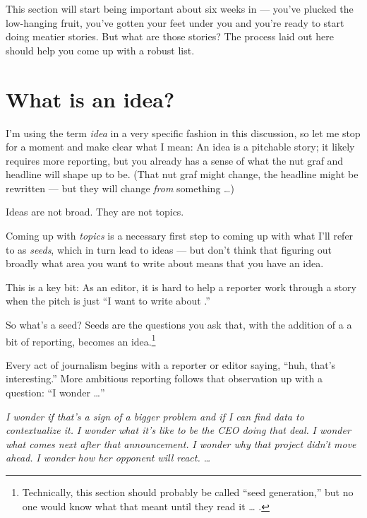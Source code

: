 \documentclass[
  11pt,
  american,
  letterpaperpaper,
  extrafontsizes,onecolumn,openright
  ]{memoir}
\begin{document}
\leavevmode{}%
\begin{greybox}[frametitle=Onboarding Path]
This section will start being important about six weeks in --- you've plucked the low-hanging fruit, you've gotten your feet under you and you're ready to start doing meatier stories. But what are those stories? The process laid out here should help you come up with a robust list.

\end{greybox}

\hypertarget{what-is-an-idea}{%
\section*{What is an idea?}\label{what-is-an-idea}}

I'm using the term \emph{idea} in a very specific fashion in this discussion, so let me stop for a moment and make clear what I mean: An idea is a pitchable story; it likely requires more reporting, but you already has a sense of what the nut graf and headline will shape up to be. (That nut graf might change, the headline might be rewritten --- but they will change \emph{from} something \ldots)

Ideas are not broad. They are not topics.

Coming up with \emph{topics} is a necessary first step to coming up with what I'll refer to as \emph{seeds}, which in turn lead to ideas --- but don't think that figuring out broadly what area you want to write about means that you have an idea.

This is a key bit: As an editor, it is hard to help a reporter work through a story when the pitch is just \enquote{I want to write about .}

So what's a seed? Seeds are the questions you ask that, with the addition of a a bit of reporting, becomes an idea.\footnote{Technically, this section should probably be called \enquote{seed generation,} but no one would know what that meant until they read it \ldots{} .}

Every act of journalism begins with a reporter or editor saying, \enquote{huh, that's interesting.} More ambitious reporting follows that observation up with a question: \enquote{I wonder \ldots{}}

\emph{I wonder if that's a sign of a bigger problem and if I can find data to contextualize it.} \emph{I wonder what it's like to be the CEO doing that deal.} \emph{I wonder what comes next after that announcement.} \emph{I wonder why that project didn't move ahead.} \emph{I wonder how her opponent will react.} \emph{\ldots{}}
\end{document}
